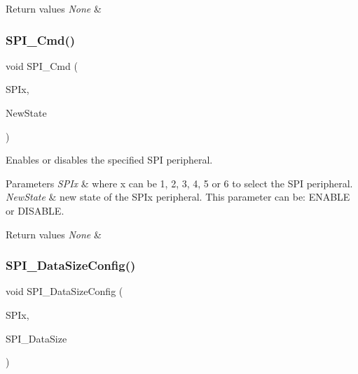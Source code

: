 \begin{DoxyRetVals}{Return values}
{\em None} & \\
\hline
\end{DoxyRetVals}
\mbox{\label{group___s_p_i___group1_gaa31357879a65ee1ed7223f3b9114dcf3}} 
\subsubsection{\texorpdfstring{S\+P\+I\+\_\+\+Cmd()}{SPI\_Cmd()}}
{\footnotesize\ttfamily void S\+P\+I\+\_\+\+Cmd (\begin{DoxyParamCaption}\item[{S\+P\+I\+\_\+\+Type\+Def $\ast$}]{S\+P\+Ix,  }\item[{Functional\+State}]{New\+State }\end{DoxyParamCaption})}



Enables or disables the specified S\+PI peripheral. 


\begin{DoxyParams}{Parameters}
{\em S\+P\+Ix} & where x can be 1, 2, 3, 4, 5 or 6 to select the S\+PI peripheral. \\
\hline
{\em New\+State} & new state of the S\+P\+Ix peripheral. This parameter can be\+: E\+N\+A\+B\+LE or D\+I\+S\+A\+B\+LE. \\
\hline
\end{DoxyParams}

\begin{DoxyRetVals}{Return values}
{\em None} & \\
\hline
\end{DoxyRetVals}
\mbox{\label{group___s_p_i___group1_gafc82e90841d7879535d655c035709cb1}} 
\subsubsection{\texorpdfstring{S\+P\+I\+\_\+\+Data\+Size\+Config()}{SPI\_DataSizeConfig()}}
{\footnotesize\ttfamily void S\+P\+I\+\_\+\+Data\+Size\+Config (\begin{DoxyParamCaption}\item[{S\+P\+I\+\_\+\+Type\+Def $\ast$}]{S\+P\+Ix,  }\item[{uint16\+\_\+t}]{S\+P\+I\+\_\+\+Data\+Size }\end{DoxyParamCaption})}



